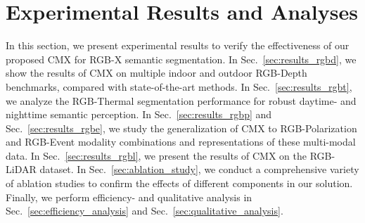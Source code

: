 \documentclass[journal]{IEEEtran}
\begin{document}
\section{Experimental Results and Analyses}
In this section, we present experimental results to verify the effectiveness of our proposed CMX for RGB-X semantic segmentation.
In Sec.~\ref{sec:results_rgbd}, we show the results of CMX on multiple indoor and outdoor RGB-Depth benchmarks, compared with state-of-the-art methods.
In Sec.~\ref{sec:results_rgbt}, we analyze the RGB-Thermal segmentation performance for robust daytime- and nighttime semantic perception.
In Sec.~\ref{sec:results_rgbp} and Sec.~\ref{sec:results_rgbe}, we study the generalization of CMX to RGB-Polarization and RGB-Event modality combinations and representations of these multi-modal data.
In Sec.~\ref{sec:results_rgbl}, we present the results of CMX on the RGB-LiDAR dataset.
In Sec.~\ref{sec:ablation_study}, we conduct a comprehensive variety of ablation studies to confirm the effects of different components in our solution.
Finally, we perform efficiency- and qualitative analysis in Sec.~\ref{sec:efficiency_analysis} and Sec.~\ref{sec:qualitative_analysis}.
\end{document}
